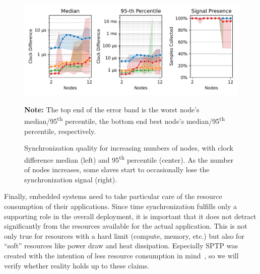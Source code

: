 \begin{figure}
\begin{center}
\includegraphics[width=\linewidth]{res/generated/resource_consumption/summary_quality_trend.pdf}
\legend
\end{center}

{\footnotesize {\bfseries Note:} The top end of the error band is the worst node's median/95\textsuperscript{th} percentile, the bottom end best node's median/95\textsuperscript{th} percentile, respectively.}
\caption{Synchronization quality for increasing numbers of nodes, with clock difference median (left) and 95\textsuperscript{th} percentile (center). As the number of nodes increases, some slaves start to occasionally lose the synchronization signal (right).}
\label{fig:resource_consumption_quality}
\end{figure}


Finally, embedded systems need to take particular care of the resource consumption of their applications. Since time synchronization fulfills only a supporting role in the overall deployment, it is important that it does not detract significantly from the resources available for the actual application. This is not only true for resources with a hard limit (compute, memory, etc.) but also for ``soft'' resources like power draw and heat dissipation. Especially SPTP was created with the intention of less resource consumption in mind~\cite{sptp}, so we will verify whether reality holds up to these claims.


